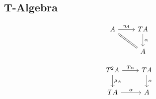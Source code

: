 \subsection{T-Algebra}
\[\begin{tikzcd}
A \ar{r}{\eta_A} \ar[equal]{rd} & TA \ar{d}{\alpha} \\
                                & A
\end{tikzcd}\]

\[\begin{tikzcd}
T^2A \ar{r}{T \alpha} \ar{d}{\mu_A} & TA \ar{d}{\alpha} \\
TA \ar{r}{\alpha} & A
\end{tikzcd}\]


